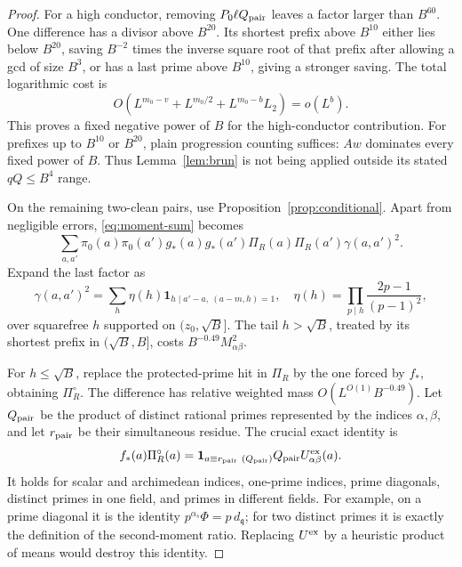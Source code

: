 \begin{proof}
For a high conductor, removing \(P_0\ell Q_{\rm pair}\) leaves a
factor larger than \(B^{60}\).  One difference has a divisor above
\(B^{20}\).  Its shortest prefix above \(B^{10}\) either lies
below \(B^{20}\), saving
\(B^{-2}\) times the inverse square root of that prefix after
allowing a gcd of size \(B^3\), or has a last prime above
\(B^{10}\), giving a stronger saving.  The total logarithmic cost
is
\[
 O(L^{m_0-v}+L^{m_0/2}+L^{m_0-b}L_2)=o(L^b).
\]
This proves a fixed negative power of \(B\) for the high-conductor
contribution.  For prefixes up to \(B^{10}\) or \(B^{20}\), plain
progression counting suffices: \(Aw\) dominates every fixed power
of \(B\).  Thus Lemma~\ref{lem:brun} is not being applied outside
its stated \(qQ\le B^4\) range.

On the remaining two-clean pairs, use
Proposition~\ref{prop:conditional}.  Apart from negligible errors,
\eqref{eq:moment-sum} becomes
\begin{equation}\label{eq:gamma-main}
 \sum_{a,a'}\pi_0(a)\pi_0(a')g_*(a)g_*(a')
                      \Pi_R(a)\Pi_R(a')\gamma(a,a')^2.
\end{equation}
Expand the last factor as
\[
 \gamma(a,a')^2
 =\sum_h\eta(h)\mathbf1_{h\mid a'-a,\ (a-m,h)=1},
 \quad
 \eta(h)=\prod_{p\mid h}\frac{2p-1}{(p-1)^2},
\]
over squarefree \(h\) supported on \((z_0,\sqrt B]\).
The tail \(h>\sqrt B\), treated by its shortest prefix in
\((\sqrt B,B]\), costs \(B^{-0.49}M_{\alpha\beta}^2\).

For \(h\le\sqrt B\), replace the protected-prime hit in
\(\Pi_R\) by the one forced by \(f_*\), obtaining
\(\Pi_R^\circ\).  The difference has relative weighted mass
\(O(L^{O(1)}B^{-0.49})\).  Let \(Q_{\rm pair}\) be the product
of distinct rational primes represented by the indices
\(\alpha,\beta\), and let \(r_{\rm pair}\) be their simultaneous
residue.  The crucial exact identity is
\begin{equation}\label{eq:exact-cancellation}
 f_*(a)\Pi_R^\circ(a)
   =\mathbf1_{a\equiv r_{\rm pair}\ (Q_{\rm pair})}
             Q_{\rm pair}U^{\rm ex}_{\alpha\beta}(a).
\end{equation}
It holds for scalar and archimedean indices, one-prime indices,
prime diagonals, distinct primes in one field, and primes in
different fields.  For example, on a prime diagonal it is the
identity \(p^{\alpha_s}\Phi=p\,d_{\mathfrak q}\); for two
distinct primes it is exactly the definition of the second-moment
ratio.  Replacing \(U^{\rm ex}\) by a heuristic product of means
would destroy this identity.


\end{proof}
